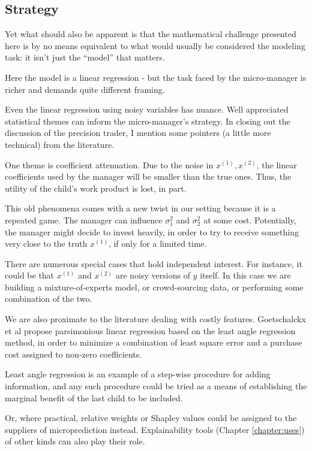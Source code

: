 \subsection{Strategy}

Yet what should also be apparent is that the mathematical challenge presented here is by no means equivalent to what would usually be considered the modeling task: it isn't just the ``model'' that matters. 

Here the model is a linear regression - but the task faced by the micro-manager is richer and demands quite different framing. 

Even the linear regression using noisy variables has nuance. Well appreciated statistical themes can inform the micro-manager's strategy. In closing out the discussion of the precision trader, I mention some pointers (a little more technical) from the literature. 

One theme is coefficient attenuation. Due to the noise in $x^{(1)}, x^{(2)}$, the linear coefficients used by the manager will be smaller than the true ones. Thus, the utility of the child's work product is lost, in part.  

This old phenomena comes with a new twist in our setting because it is a repeated game. The manager can influence $\sigma_1^2$ and $\sigma_2^2$ at some cost. Potentially, the manager might decide to invest heavily, in order to try to receive something very close to the truth $x^{(1)}$, if only for a limited time. 

 
There are numerous special cases that hold independent interest. For instance, it could be that $x^{(1)}$ and $x^{(2)}$ are noisy versions of $y$ itself. In this case we are building a mixture-of-experts model, or crowd-sourcing data, or performing some combination of the two.  

We are also proximate to the literature dealing with costly features. Goetschalckx et al propose parsimonious linear regression based on the least angle regression method, in order to minimize a combination of least square error and a purchase cost assigned to non-zero coefficients. 

Least angle regression is an example of a step-wise procedure for adding information, and any such procedure could be tried as a means of establishing the marginal benefit of the last child to be included. 

Or, where practical, relative weights or Shapley values could be assigned to the suppliers of microprediction instead. Explainability tools (Chapter \ref{chapter:uses}) of other kinds can also play their role. 


